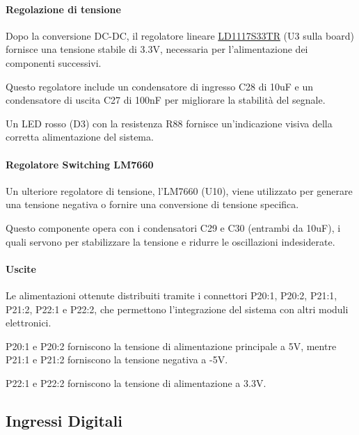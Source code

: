 \documentclass[12pt,a4paper]{report}
\begin{document}
\paragraph{Regolazione di tensione}
Dopo la conversione DC-DC, il regolatore lineare 
\href{https://www.mouser.it/datasheet/2/389/ld1117-1849389.pdf}{LD1117S33TR} (U3 sulla board) fornisce una tensione stabile di 3.3V, 
necessaria per l'alimentazione dei componenti successivi. 

Questo regolatore include un condensatore di ingresso C28 di 10uF e 
un condensatore di uscita C27 di 100nF per migliorare la stabilità del segnale.

Un LED rosso (D3) con la resistenza R88 fornisce un'indicazione visiva della corretta alimentazione del sistema.

\paragraph{Regolatore Switching LM7660}
Un ulteriore regolatore di tensione, l'LM7660 (U10), 
viene utilizzato per generare una tensione negativa o fornire una conversione di tensione specifica. 

Questo componente opera con i condensatori C29 e C30 (entrambi da 10uF), i quali servono per stabilizzare la tensione e ridurre le oscillazioni indesiderate.

\paragraph{Uscite}
Le alimentazioni ottenute distribuiti tramite i connettori P20:1, P20:2, P21:1, P21:2, P22:1 e P22:2, 
che permettono l'integrazione del sistema con altri moduli elettronici.

P20:1 e P20:2 forniscono la tensione di alimentazione principale a 5V, mentre P21:1 e P21:2 forniscono la tensione negativa a -5V.

P22:1 e P22:2 forniscono la tensione di alimentazione a 3.3V.

\newpage

\subsection{Ingressi Digitali}
\end{document}
